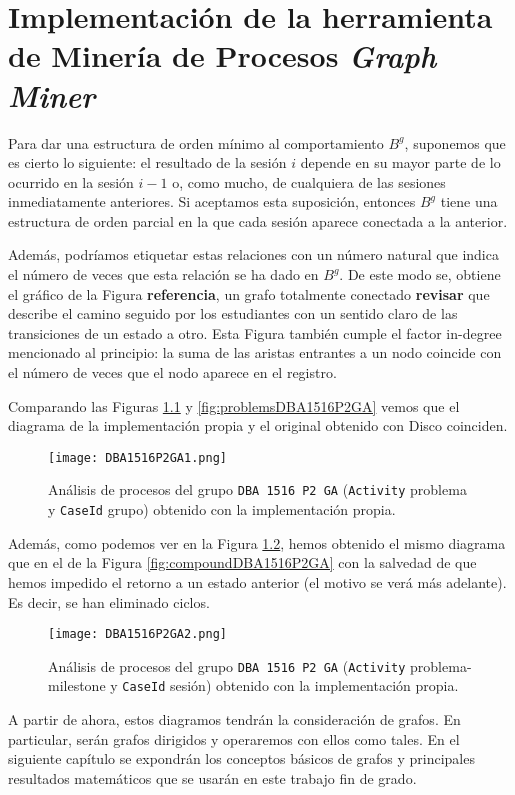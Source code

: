 \chapter{Implementación de la herramienta de Minería de Procesos \emph{Graph Miner}}

Para dar una estructura de orden mínimo al comportamiento $B^g$, suponemos que es cierto lo siguiente: el resultado de la sesión $i$ depende en su mayor parte de lo ocurrido en la sesión $i-1$
o, como mucho, de cualquiera de las sesiones inmediatamente anteriores. Si aceptamos esta suposición, entonces $B^g$ tiene una estructura de orden parcial en la que cada sesión aparece conectada a la anterior.

Además, podríamos etiquetar estas relaciones con un número natural que indica el número de veces que esta relación se ha dado en $B^g$. De este modo se, obtiene el gráfico de la Figura \textbf{referencia}, un grafo totalmente conectado \textbf{revisar} que describe el camino seguido por los estudiantes con un sentido claro de las transiciones de un estado a otro. Esta Figura también cumple el factor in-degree mencionado al principio: la suma de las aristas entrantes a un nodo coincide con el número de veces que el nodo aparece en el registro.

Comparando las Figuras \ref{fig:DBA1516P2GA1} y \ref{fig:problemsDBA1516P2GA} vemos que el diagrama de la implementación propia y el original obtenido con Disco coinciden.

\begin{figure}[H]
    \centering
    \texttt{[image: DBA1516P2GA1.png]}
    \caption{Análisis de procesos del grupo \texttt{DBA 1516 P2 GA} (\texttt{Activity} problema y \texttt{CaseId} grupo) obtenido con la implementación propia.}
    \label{fig:DBA1516P2GA1}
\end{figure}

Además, como podemos ver en la Figura \ref{fig:DBA1516P2GA2}, hemos obtenido el mismo diagrama que en el de la Figura \ref{fig:compoundDBA1516P2GA} con la salvedad de que hemos impedido el retorno a un estado anterior (el motivo se verá más adelante). Es decir, se han eliminado ciclos.

\begin{figure}[H]
    \centering
    \texttt{[image: DBA1516P2GA2.png]}
    \caption{Análisis de procesos del grupo \texttt{DBA 1516 P2 GA} (\texttt{Activity} problema-milestone y \texttt{CaseId} sesión) obtenido con la implementación propia.}
    \label{fig:DBA1516P2GA2}
\end{figure}

A partir de ahora, estos diagramos tendrán la consideración de grafos. En particular, serán grafos dirigidos y operaremos con ellos como tales. En el siguiente capítulo se expondrán los conceptos básicos de grafos y principales resultados matemáticos que se usarán en este trabajo fin de grado.
